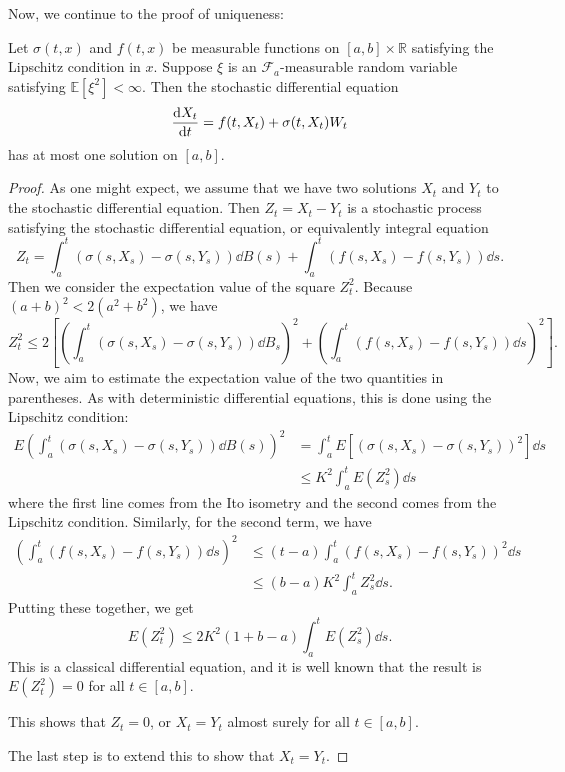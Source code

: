 \documentclass[prb,12pt]{revtex4-2}
\theoremstyle{definition}
\theoremstyle{definition}
\theoremstyle{definition}
\newcommand{\R}{\mathbb{R}}
\begin{document}
Now, we continue to the proof of uniqueness:
\begin{Theorem}
	Let $\sigma(t,x)$ and $f(t,x)$ be measurable functions on $[a,b]\times \R$ satisfying the Lipschitz condition in $x$. Suppose $\xi$ is an $\mathcal{F}_a$-measurable random variable satisfying $\mathbb{E}[\xi^2]<\infty$. Then the stochastic differential equation
	\[\dv{X_t}{t}=f(t, X_t)+\sigma(t, X_t)W_t\]
	has at most one solution on $[a,b]$.
\end{Theorem}
\begin{proof}
	As one might expect, we assume that we have two solutions $X_t$ and $Y_t$ to the stochastic differential equation. Then $Z_t=X_t-Y_t$ is a stochastic process satisfying the stochastic differential equation, or equivalently integral equation
	\[Z_t = \int_a^t (\sigma(s, X_s) - \sigma (s, Y_s))\dd{B(s)}+\int_a^t (f(s, X_s) - f(s, Y_s))\dd{s}.\]
	Then we consider the expectation value of the square $Z_t^2$. Because $(a+b)^2 < 2(a^2+b^2)$, we have
	\[Z_t^2 \le 2\left[\left(\int_a^t (\sigma(s, X_s) - \sigma(s, Y_s))\dd{B_s}\right)^2 + \left(\int_a^t (f(s, X_s) - f(s, Y_s))\dd{s}\right)^2\right].\]
	Now, we aim to estimate the expectation value of the two quantities in parentheses. As with deterministic differential equations, this is done using the Lipschitz condition:
	\begin{align*}
		E\left(\int_a^t (\sigma(s, X_s) - \sigma(s, Y_s))\dd{B(s)}\right)^2&= \int_a^t E[(\sigma(s, X_s)-\sigma(s, Y_s))^2]\dd{s}\\
		&\le K^2 \int_a^t E(Z_s^2)\dd{s}
	\end{align*} 
where the first line comes from the Ito isometry and the second comes from the Lipschitz condition. Similarly, for the second term, we have
\begin{align*}
	\left(\int_a^t (f(s, X_s) - f(s, Y_s))\dd{s}\right)^2 &\le (t-a)\int_a^t (f(s, X_s) - f(s, Y_s))^2 \dd{s}\\
	&\le (b-a)K^2 \int_a^t Z_s^2\dd{s}.
\end{align*}
Putting these together, we get
\[E(Z_t^2)\le 2K^2(1+b-a)\int_a^t E(Z_s^2)\dd{s}.\]
This is a classical differential equation, and it is well known that the result is $E(Z_t^2)=0$ for all $t\in [a,b]$.

This shows that $Z_t=0$, or $X_t=Y_t$ almost surely for all $t\in [a,b]$. 

The last step is to extend this to show that $X_t=Y_t$. 
\end{proof}


\end{document}
